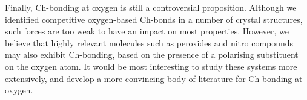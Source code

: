 \begin{refsection}
Finally, Ch-bonding at oxygen is still a controversial proposition.
Although we identified competitive oxygen-based Ch-bonds in a number of crystal structures, such forces are too weak to have an impact on most properties.
However, we believe that highly relevant molecules such as peroxides and nitro compounds may also exhibit Ch-bonding, based on the presence of a polarising substituent on the oxygen atom.
It would be most interesting to study these systems more extensively, and develop a more convincing body of literature for Ch-bonding at oxygen.

\printbibliography[heading=subbibliography]
\end{refsection}
